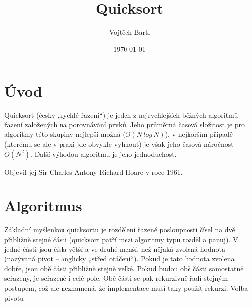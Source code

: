 \documentclass{article}
\title{Quicksort}
\author{Vojtěch Bartl}
\date{\today}
\begin{document}
\maketitle
\section{Úvod}
Quicksort (česky „rychlé řazení“) je jeden z nejrychlejších běžných algoritmů řazení založených na porovnávání prvků. Jeho průměrná časová složitost je pro algoritmy této skupiny nejlepší možná ($O(N\,log\,N)$), v nejhorším případě (kterému se ale v praxi jde obvykle vyhnout) je však jeho časová náročnost $O(N^2)$. Další výhodou algoritmu je jeho jednoduchost.

Objevil jej Sir Charles Antony Richard Hoare v roce 1961.
\section{Algoritmus}

Základní myšlenkou quicksortu je rozdělení řazené posloupnosti čísel na dvě přibližně stejné části (quicksort patří mezi algoritmy typu rozděl a panuj). V jedné části jsou čísla větší a ve druhé menší, než nějaká zvolená hodnota (nazývaná pivot – anglicky „střed otáčení“). Pokud je tato hodnota zvolena dobře, jsou obě části přibližně stejně velké. Pokud budou obě části samostatně seřazeny, je seřazené i celé pole. Obě části se pak rekurzivně řadí stejným postupem, což ale neznamená, že implementace musí taky použít rekurzi.
Volba pivotu
\end{document}
